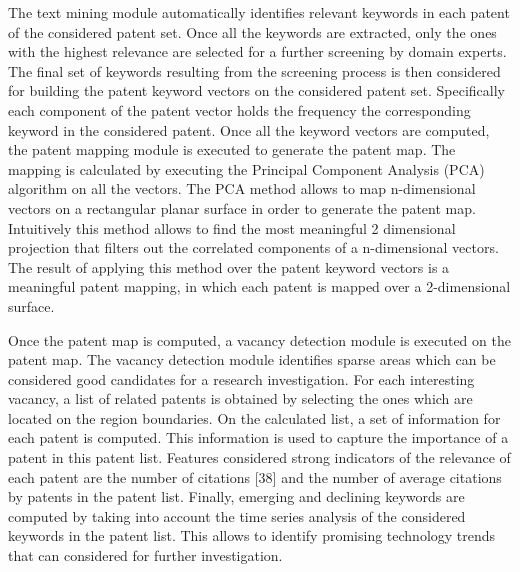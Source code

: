 \documentclass[b5paper,]{book}
\theoremstyle{definition}
\theoremstyle{definition}
\theoremstyle{definition}
\theoremstyle{remark}
\begin{document}
The text mining module automatically identifies relevant keywords in
each patent of the considered patent set. Once all the keywords are
extracted, only the ones with the highest relevance are selected for a
further screening by domain experts. The final set of keywords resulting
from the screening process is then considered for building the patent
keyword vectors on the considered patent set. Specifically each
component of the patent vector holds the frequency the corresponding
keyword in the considered patent. Once all the keyword vectors are
computed, the patent mapping module is executed to generate the patent
map. The mapping is calculated by executing the Principal Component
Analysis (PCA) algorithm on all the vectors. The PCA method allows to
map n-dimensional vectors on a rectangular planar surface in order to
generate the patent map. Intuitively this method allows to find the most
meaningful 2 dimensional projection that filters out the correlated
components of a n-dimensional vectors. The result of applying this
method over the patent keyword vectors is a meaningful patent mapping,
in which each patent is mapped over a 2-dimensional surface.

Once the patent map is computed, a vacancy detection module is executed
on the patent map. The vacancy detection module identifies sparse areas
which can be considered good candidates for a research investigation.
For each interesting vacancy, a list of related patents is obtained by
selecting the ones which are located on the region boundaries. On the
calculated list, a set of information for each patent is computed. This
information is used to capture the importance of a patent in this patent
list. Features considered strong indicators of the relevance of each
patent are the number of citations {[}38{]} and the number of average
citations by patents in the patent list. Finally, emerging and declining
keywords are computed by taking into account the time series analysis of
the considered keywords in the patent list. This allows to identify
promising technology trends that can considered for further
investigation.
\end{document}
